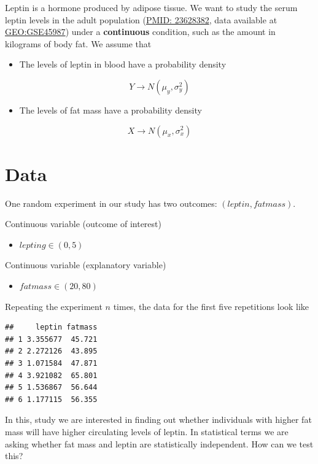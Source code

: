 \documentclass[
]{book}
\providecommand{\tightlist}{%
  \setlength{\itemsep}{0pt}\setlength{\parskip}{0pt}}
\begin{document}
Leptin is a hormone produced by adipose tissue. We want to study the serum leptin levels in the adult population (\href{https://pubmed.ncbi.nlm.nih.gov/23628382/}{PMID: 23628382}, data available at \href{https://www.ncbi.nlm.nih.gov/geo/query/acc.cgi?acc=GSE45987}{GEO:GSE45987}) under a \textbf{continuous} condition, such as the amount in kilograms of body fat. We assume that

\begin{itemize}
\tightlist
\item
  The levels of leptin in blood have a probability density
\end{itemize}

\[Y \rightarrow N(\mu_y, \sigma_y^2)\]

\begin{itemize}
\tightlist
\item
  The levels of fat mass have a probability density
\end{itemize}

\[X \rightarrow N(\mu_x, \sigma_x^2)\]

\hypertarget{data-5}{%
\section{Data}\label{data-5}}

One random experiment in our study has two outcomes: \((leptin, fatmass)\).

Continuous variable (outcome of interest)

\begin{itemize}
\tightlist
\item
  \(lepting \in (0, 5)\)
\end{itemize}

Continuous variable (explanatory variable)

\begin{itemize}
\tightlist
\item
  \(fatmass \in (20,80)\)
\end{itemize}

Repeating the experiment \(n\) times, the data for the first five repetitions look like

\begin{verbatim}
##     leptin fatmass
## 1 3.355677  45.721
## 2 2.272126  43.895
## 3 1.071584  47.871
## 4 3.921082  65.801
## 5 1.536867  56.644
## 6 1.177115  56.355
\end{verbatim}

In this, study we are interested in finding out whether individuals with higher fat mass will have higher circulating levels of leptin. In statistical terms we are asking whether fat mass and leptin are statistically independent. How can we test this?
\end{document}
